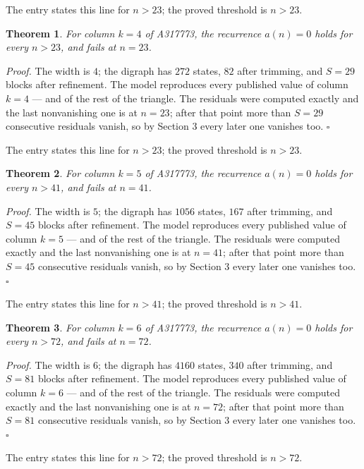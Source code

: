 \documentclass[11pt]{article}
\newtheorem{theorem}{Theorem}
\theoremstyle{definition}
\begin{document}
The entry states this line for $n > 23$; the proved threshold is $n > 23$.

\begin{theorem} For column $k = 4$ of A317773, the recurrence $a(n) = 0$ holds for every $n > 23$, and fails at $n = 23$.\end{theorem}

{\itshape Proof.} The width is $4$; the digraph has $272$ states, $82$ after trimming, and $S = 29$ blocks after refinement. The model reproduces every published value of column $k = 4$ --- and of the rest of the triangle. The residuals were computed exactly and the last nonvanishing one is at $n = 23$; after that point more than $S = 29$ consecutive residuals vanish, so by Section 3 every later one vanishes too. $\square$

The entry states this line for $n > 23$; the proved threshold is $n > 23$.

\begin{theorem} For column $k = 5$ of A317773, the recurrence $a(n) = 0$ holds for every $n > 41$, and fails at $n = 41$.\end{theorem}

{\itshape Proof.} The width is $5$; the digraph has $1056$ states, $167$ after trimming, and $S = 45$ blocks after refinement. The model reproduces every published value of column $k = 5$ --- and of the rest of the triangle. The residuals were computed exactly and the last nonvanishing one is at $n = 41$; after that point more than $S = 45$ consecutive residuals vanish, so by Section 3 every later one vanishes too. $\square$

The entry states this line for $n > 41$; the proved threshold is $n > 41$.

\begin{theorem} For column $k = 6$ of A317773, the recurrence $a(n) = 0$ holds for every $n > 72$, and fails at $n = 72$.\end{theorem}

{\itshape Proof.} The width is $6$; the digraph has $4160$ states, $340$ after trimming, and $S = 81$ blocks after refinement. The model reproduces every published value of column $k = 6$ --- and of the rest of the triangle. The residuals were computed exactly and the last nonvanishing one is at $n = 72$; after that point more than $S = 81$ consecutive residuals vanish, so by Section 3 every later one vanishes too. $\square$

The entry states this line for $n > 72$; the proved threshold is $n > 72$.
\end{document}
